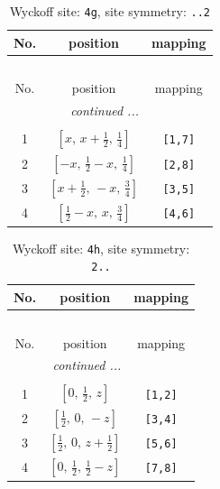 \documentclass[fleqn,8pt]{jsarticle}
\begin{document}
\renewcommand{\arraystretch}{1.2}
\begin{longtable}{ccc}
\caption{Wyckoff site: {\tt 4g}, site symmetry: {\tt ..2}}
 \\
 \hline \hline
No. & position & mapping \\ \hline \endfirsthead

\multicolumn{2}{l}{\tablename\ \thetable{}} \\
 \hline \hline
No. & position & mapping \\ \hline \endhead

 \hline \hline
\multicolumn{2}{r}{\footnotesize\it continued ...} \\ \endfoot

 \hline \hline
\multicolumn{2}{r}{} \\ \endlastfoot

1 & $\left[ x,\, x + \frac{1}{2},\, \frac{1}{4} \right]$ & {\tt [1,7]} \\ \hline
2 & $\left[ - x,\, \frac{1}{2} - x,\, \frac{1}{4} \right]$ & {\tt [2,8]} \\ \hline
3 & $\left[ x + \frac{1}{2},\, - x,\, \frac{3}{4} \right]$ & {\tt [3,5]} \\ \hline
4 & $\left[ \frac{1}{2} - x,\, x,\, \frac{3}{4} \right]$ & {\tt [4,6]} \\
\end{longtable}
\renewcommand{\arraystretch}{1.2}
\begin{longtable}{ccc}
\caption{Wyckoff site: {\tt 4h}, site symmetry: {\tt 2..}}
 \\
 \hline \hline
No. & position & mapping \\ \hline \endfirsthead

\multicolumn{2}{l}{\tablename\ \thetable{}} \\
 \hline \hline
No. & position & mapping \\ \hline \endhead

 \hline \hline
\multicolumn{2}{r}{\footnotesize\it continued ...} \\ \endfoot

 \hline \hline
\multicolumn{2}{r}{} \\ \endlastfoot

1 & $\left[ 0,\, \frac{1}{2},\, z \right]$ & {\tt [1,2]} \\ \hline
2 & $\left[ \frac{1}{2},\, 0,\, - z \right]$ & {\tt [3,4]} \\ \hline
3 & $\left[ \frac{1}{2},\, 0,\, z + \frac{1}{2} \right]$ & {\tt [5,6]} \\ \hline
4 & $\left[ 0,\, \frac{1}{2},\, \frac{1}{2} - z \right]$ & {\tt [7,8]} \\
\end{longtable}
\end{document}
